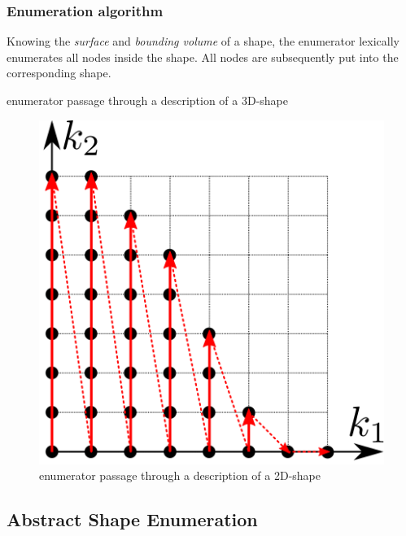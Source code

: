 \documentclass{article}
\begin{document}
\begin{figure}[htbp]
  \centering


\end{figure}

\subsubsection{Enumeration algorithm}
Knowing the \emph{surface} and \emph{bounding volume} of a shape, the
enumerator lexically enumerates all nodes inside the shape. All nodes
are subsequently put into the corresponding shape.

\begin{algorithm}[H]
  \caption{enumerator passage through a description of a 3D-shape}
\end{algorithm}

\begin{figure}[H]
  \centering
  \includegraphics[]{shape_enumerator}
  \caption{enumerator passage through a description of a 2D-shape}
  \label{fig:shape_example}
\end{figure}

\subsection{Abstract Shape Enumeration}
\end{document}

